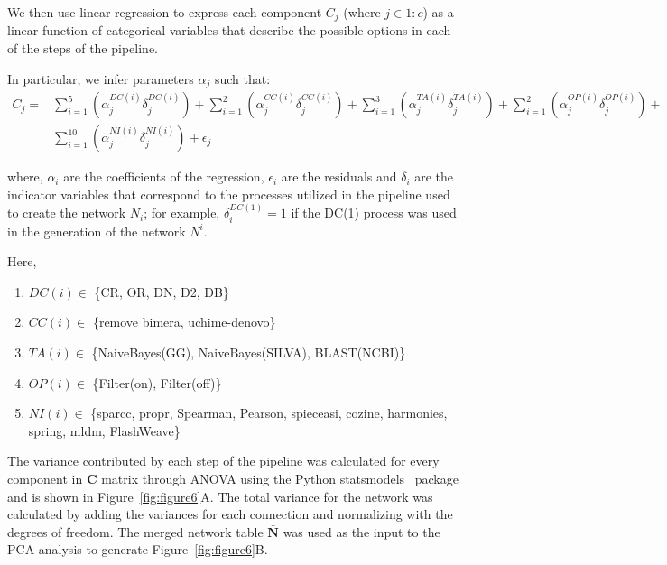 \documentclass[letterpaper,12pt]{article}
\begin{document}
  We then use linear regression to express each component $C_j$ (where $j \in 1:c$) as a linear function of categorical variables that describe the possible options in each of the steps of the pipeline.

  In particular, we infer parameters $\alpha_j$ such that:
  \begin{multline}
  C_j = &\sum_{i=1}^5 \left( \alpha^{DC(i)}_j \delta^{DC(i)}_j \right) +
         \sum_{i=1}^2 \left( \alpha^{CC(i)}_j \delta^{CC(i)}_j \right) +
         \sum_{i=1}^3 \left( \alpha^{TA(i)}_j \delta^{TA(i)}_j \right) +
         \sum_{i=1}^2 \left( \alpha^{OP(i)}_j \delta^{OP(i)}_j \right) + \\
         &\sum_{i=1}^{10} \left( \alpha^{NI(i)}_j \delta^{NI(i)}_j \right) +
         \epsilon_j
  \end{multline}

   where, $\alpha_i$ are the coefficients of the regression, $\epsilon_i$ are the residuals and $\delta_i$ are the indicator variables that correspond to the processes utilized in the pipeline used to create the network $N_i$; for example, $\delta^{DC(1)}_i = 1$ if the DC(1) process was used in the generation of the network $N^i$.

   Here,
   \begin{enumerate}
     \item $DC(i) \in$ \{CR, OR, DN, D2, DB\}
     \item $CC(i) \in$ \{remove bimera, uchime-denovo\}
     \item $TA(i) \in$ \{NaiveBayes(GG), NaiveBayes(SILVA), BLAST(NCBI)\}
     \item $OP(i) \in$ \{Filter(on), Filter(off)\}
     \item $NI(i) \in$ \{\acs{sparcc}, propr, Spearman, Pearson, \acs{spieceasi}, \acs{cozine}, \acs{harmonies}, \acs{spring}, \acs{mldm}, FlashWeave\}
   \end{enumerate}

   The variance contributed by each step of the pipeline was calculated for every component in $\mathbf{C}$ matrix through ANOVA using the Python statsmodels~\cite{seaboldStatsmodelsEconometricStatistical2010} package and is shown in Figure~\ref{fig:figure6}A.
  The total variance for the network was calculated by adding the variances for each connection and normalizing with the degrees of freedom.
  The merged network table $\mathbf{\bar{N}}$ was used as the input to the PCA analysis to generate Figure~\ref{fig:figure6}B.
\end{document}
